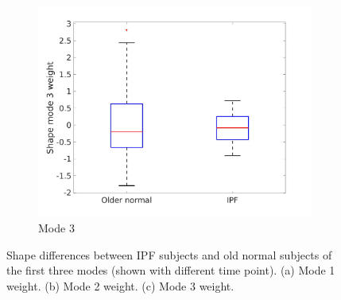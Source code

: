 \begin{figure}[htbp]
\begin{subfigure}{.6\linewidth}
  \includegraphics[width=\linewidth,trim={{.0\wd0} {.0\wd0} {.0\wd0} {.0\wd0}},clip]{QuantitativeAnalysis/Image/BoxPlot_Mode3.jpg}
  \caption{Mode 3}
  \label{fig:ShapeDifference-c}
\end{subfigure}
\caption{ Shape differences between IPF subjects and old normal subjects of the first three modes (shown with different time point). (a) Mode 1 weight. (b) Mode 2 weight. (c) Mode 3  weight.}
\label{fig:ShapeDifference}
\end{figure}

